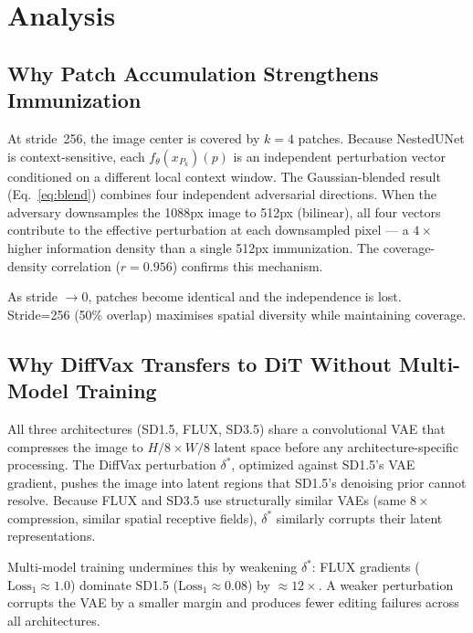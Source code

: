 \documentclass{article}
\begin{document}
\section{Analysis}

\subsection{Why Patch Accumulation Strengthens Immunization}
\label{sec:h2_analysis}

At stride~256, the image center is covered by $k=4$ patches. Because NestedUNet is
context-sensitive, each $f_\theta(x_{P_k})(p)$ is an independent perturbation vector
conditioned on a different local context window. The Gaussian-blended result (Eq.~\ref{eq:blend})
combines four independent adversarial directions. When the adversary downsamples the
1088px image to 512px (bilinear), all four vectors contribute to the effective perturbation
at each downsampled pixel --- a $4\times$ higher information density than a single
512px immunization. The coverage-density correlation ($r=0.956$) confirms this mechanism.

As stride $\to 0$, patches become identical and the independence is lost. Stride=256
(50\% overlap) maximises spatial diversity while maintaining coverage.

\subsection{Why DiffVax Transfers to DiT Without Multi-Model Training}

All three architectures (SD1.5, FLUX, SD3.5) share a convolutional VAE that compresses
the image to $H/8\!\times\!W/8$ latent space before any architecture-specific processing.
The DiffVax perturbation $\delta^*$, optimized against SD1.5's VAE gradient, pushes the
image into latent regions that SD1.5's denoising prior cannot resolve.
Because FLUX and SD3.5 use structurally similar VAEs (same $8\times$ compression,
similar spatial receptive fields), $\delta^*$ similarly corrupts their latent representations.

Multi-model training undermines this by weakening $\delta^*$: FLUX gradients
($\text{Loss}_1\approx1.0$) dominate SD1.5 ($\text{Loss}_1\approx0.08$) by
${\approx}12\times$. A weaker perturbation corrupts the VAE by a smaller margin and
produces fewer editing failures across all architectures.
\end{document}

